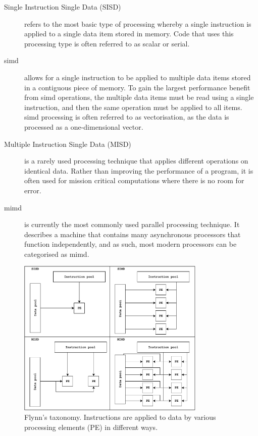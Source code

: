 \documentclass[a4paper,11pt]{report}
\begin{document}
\begin{description}
	\item[Single Instruction Single Data (SISD)] refers to the most basic type of processing whereby a single instruction is applied to a single data item stored in memory. Code that uses this processing type is often referred to as scalar or serial. 
	
	\item[\gls{simd}] allows for a single instruction to be applied to multiple data items stored in a contiguous piece of memory. To gain the largest performance benefit from \gls{simd} operations, the multiple data items must be read using a single instruction, and then the same operation must be applied to all items. \gls{simd} processing is often referred to as vectorisation, as the data is processed as a one-dimensional vector. 
	
	\item[Multiple Instruction Single Data (MISD)] is a rarely used processing technique that applies different operations on identical data. Rather than improving the performance of a program, it is often used for mission critical computations where there is no room for error. 
	
	\item[\gls{mimd}] is currently the most commonly used parallel processing technique. It describes a machine that contains many asynchronous processors that function independently, and as such, most modern processors can be categorised as \gls{mimd}.
\end{description}
\par
\begin{figure}[htbp]
\begin{center}
\includegraphics[width=0.8\textwidth]{img/Flynns.pdf}
\caption[Flynn's taxonomy]{Flynn's taxonomy. Instructions are applied to data by various processing elements (PE) in different ways. }
\label{fig:Flynn's}
\end{center}
\end{figure}
\end{document}
